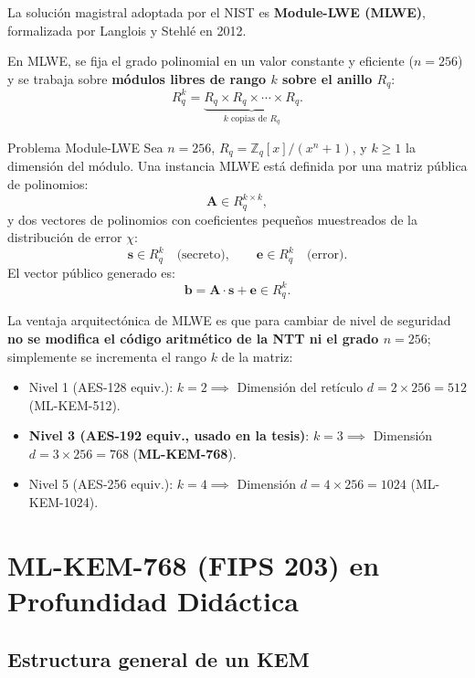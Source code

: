\documentclass[11pt,a4paper,twoside,openright]{book}
\theoremstyle{plain}
\theoremstyle{definition}
\theoremstyle{remark}
\newcommand{\Zq}{\mathbb{Z}_q}
\newcommand{\Rq}{R_q}
\newcommand{\vv}[1]{\mathbf{#1}}
\newcommand{\mm}[1]{\mathbf{#1}}
\newcommand{\MLKEM}{\textsf{ML-KEM}}
\begin{document}
La soluci\'on magistral adoptada por el NIST es \textbf{Module-LWE (MLWE)}, formalizada por Langlois y Stehl\'e en 2012.

En MLWE, se fija el grado polinomial en un valor constante y eficiente ($n = 256$) y se trabaja sobre \textbf{m\'odulos libres de rango $k$ sobre el anillo $\Rq$}:
\[
  \Rq^k = \underbrace{\Rq \times \Rq \times \cdots \times \Rq}_{k \text{ copias de } \Rq}.
\]

\begin{midef}{Problema Module-LWE}
Sea $n = 256$, $\Rq = \Zq[x]/(x^n + 1)$, y $k \geq 1$ la dimensi\'on del m\'odulo.
Una instancia MLWE est\'a definida por una matriz p\'ublica de polinomios:
\[
  \mm{A} \in \Rq^{k \times k},
\]
y dos vectores de polinomios con coeficientes peque\~nos muestreados de la distribuci\'on de error $\chi$:
\[
  \vv{s} \in \Rq^k \quad \text{(secreto)}, \qquad \vv{e} \in \Rq^k \quad \text{(error)}.
\]
El vector p\'ublico generado es:
\[
  \vv{b} = \mm{A} \cdot \vv{s} + \vv{e} \in \Rq^k.
\]
\end{midef}

\begin{intuicion}
La ventaja arquitect\'onica de MLWE es que para cambiar de nivel de seguridad \textbf{no se modifica el c\'odigo aritm\'etico de la NTT ni el grado $n=256$}; simplemente se incrementa el rango $k$ de la matriz:
\begin{itemize}
  \item Nivel 1 (AES-128 equiv.): $k = 2 \implies$ Dimensi\'on del ret\'iculo $d = 2 \times 256 = 512$ (\MLKEM{}-512).
  \item \textbf{Nivel 3 (AES-192 equiv., usado en la tesis)}: $k = 3 \implies$ Dimensi\'on $d = 3 \times 256 = 768$ (\textbf{\MLKEM{}-768}).
  \item Nivel 5 (AES-256 equiv.): $k = 4 \implies$ Dimensi\'on $d = 4 \times 256 = 1024$ (\MLKEM{}-1024).
\end{itemize}
\end{intuicion}

\chapter{ML-KEM-768 (FIPS 203) en Profundidad Did\'actica}
\label{chap:mlkem_detalle}

\section{Estructura general de un KEM}
\end{document}
